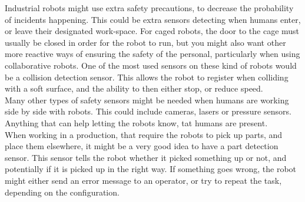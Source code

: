 Industrial robots might use extra safety precautions, to decrease the probability of incidents happening. This could be extra sensors detecting when humans enter, or leave their designated work-space. For caged robots, the door to the cage must usually be closed in order for the robot to run, but you might also want other more reactive ways of ensuring the safety of the personal, particularly when using collaborative robots. One of the most used sensors on these kind of robots would be a collision detection sensor. This allows the robot to register when colliding with a soft surface, and the ability to then either stop, or reduce speed.\\ 

Many other types of safety sensors might be needed when humans are working side by side with robots. This could include cameras, lasers or pressure sensors. Anything that can help letting the robots know, tat humans are present.\\ 

When working in a production, that require the robots to pick up parts, and place them elsewhere, it might be a very good idea to have a part detection sensor. This sensor tells the robot whether it picked something up or not, and potentially if it is picked up in the right way. If something goes wrong, the robot might either send an error message to an operator, or try to repeat the task, depending on the configuration.\\
\cite{sensors}


